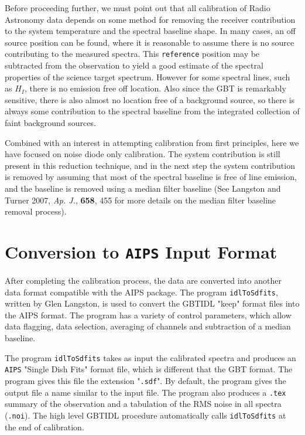 \documentclass[12pt,twoside]{article}
\begin{document}
Before proceeding further, we must point out that 
all calibration of Radio Astronomy data depends on some method for removing
the receiver contribution to the system temperature and the spectral baseline shape.
In many cases, an off source position can be found, where it is reasonable to assume
there is no source contributing to the measured spectra.  This {\tt reference} position
may be subtracted from the observation to yield a good estimate of the spectral
properties of the science target spectrum.   However for some spectral lines,
such as $H_I$, there is no emission free off location.   Also since the GBT is
remarkably sensitive, there is also almost no location free of a background source,
so there is always some contribution to the spectral baseline from the integrated
collection of faint background sources.

Combined with an interest in attempting calibration from first principles, here
we have focused on noise diode only calibration.   The system 
contribution is still present in this reduction technique, and in the
next step the system contribution is removed by assuming that most
of the spectral baseline is free of line emission, and the baseline
is removed using a median filter baseline (See Langston and Turner 2007, {\it Ap. J.},
{\bf 658}, 455 for more details on the median filter baseline removal process).

\section{Conversion to {\tt AIPS} Input Format}

After completing the calibration process, the data are converted into another data
format compatible with the AIPS package.   The program {\tt idlToSdfits}, written by
Glen Langston, is used to convert the GBTIDL "keep" format files into the AIPS format.
The program has a variety of control parameters, which allow data flagging, data
selection, averaging of channels and subtraction of a median baseline.

The program {\tt idlToSdfits} takes as input the calibrated spectra and produces
an {\tt AIPS} "Single Dish Fits" format file, which is different that the GBT format.
The program gives this file the extension "{\tt .sdf}".   
By default, the program gives the output file a name similar to the input file.
The program also
produces a {\tt .tex} summary of the observation and a tabulation of the
RMS noise in all spectra  ({\tt .noi}).
The high level GBTIDL procedure automatically calls {\tt idlToSdfits} at the end
of calibration.
\end{document}
